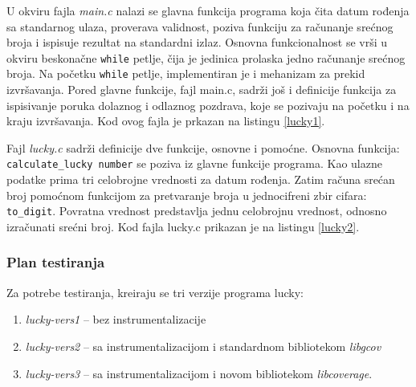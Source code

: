 \documentclass[12pt,oneside]{memoir}
\newcommand{\kod}[1]{\texttt{#1}}
\newcommand{\strano}[1]{\textit{#1}}
\begin{document}
U okviru fajla \strano{main.c} nalazi se glavna funkcija programa koja čita datum rođenja sa standarnog ulaza, proverava validnost, poziva funkciju za računanje srećnog broja i ispisuje rezultat na standardni izlaz. Osnovna funkcionalnost se vrši u okviru beskonačne \kod{while} petlje, čija je jedinica prolaska jedno računanje srećnog broja. Na početku \kod{while} petlje, implementiran je i mehanizam za prekid izvršavanja. Pored glavne funkcije, fajl main.c, sadrži još i definicije funkcija za ispisivanje poruka dolaznog i odlaznog pozdrava, koje se pozivaju na početku i na kraju izvršavanja. Kod ovog fajla je prkazan na listingu \ref{lucky1}.

Fajl \strano{lucky.c} sadrži definicije dve funkcije, osnovne i pomoćne. Osnovna funkcija: \kod{calculate\_lucky\ number} se poziva iz glavne funkcije programa. Kao ulazne podatke prima tri celobrojne vrednosti za datum rođenja. Zatim računa srećan broj pomoćnom funkcijom za pretvaranje broja u jednocifreni zbir cifara: \kod{to\_digit}. Povratna vrednost predstavlja jednu celobrojnu vrednost, odnosno izračunati srećni broj. Kod fajla lucky.c prikazan je na listingu \ref{lucky2}.
\\
\subsubsection{Plan testiranja}

Za potrebe testiranja, kreiraju se tri verzije programa lucky:
\begin{enumerate}
\item \strano{lucky-vers1} – bez instrumentalizacije
\item \strano{lucky-vers2} – sa instrumentalizacijom i standardnom bibliotekom \strano{libgcov}
\item \strano{lucky-vers3} – sa instrumentalizacijom i novom bibliotekom \strano{libcoverage}. 
\end{enumerate}
\end{document}
